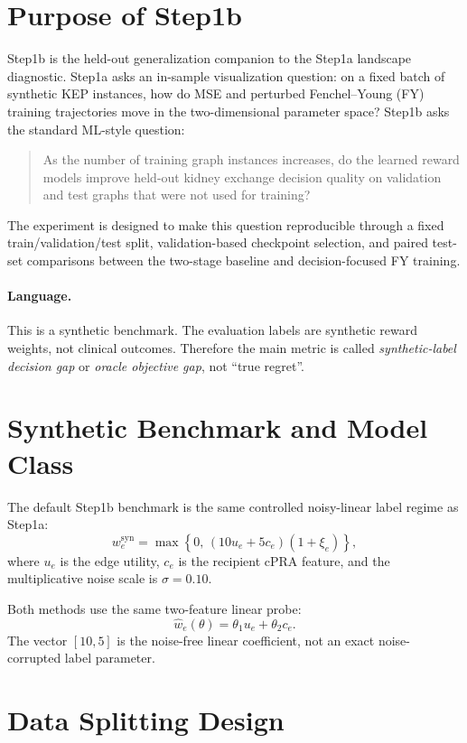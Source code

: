 \section{Purpose of Step1b}

Step1b is the held-out generalization companion to the Step1a landscape
diagnostic. Step1a asks an in-sample visualization question: on a fixed batch of
synthetic KEP instances, how do MSE and perturbed Fenchel--Young (FY) training
trajectories move in the two-dimensional parameter space? Step1b asks the
standard ML-style question:

\begin{quote}
As the number of training graph instances increases, do the learned reward
models improve held-out kidney exchange decision quality on validation and test
graphs that were not used for training?
\end{quote}

The experiment is designed to make this question reproducible through a fixed
train/validation/test split, validation-based checkpoint selection, and paired
test-set comparisons between the two-stage baseline and decision-focused FY
training.

\paragraph{Language.}
This is a synthetic benchmark. The evaluation labels are synthetic reward
weights, not clinical outcomes. Therefore the main metric is called
\emph{synthetic-label decision gap} or \emph{oracle objective gap}, not ``true
regret''.

\section{Synthetic Benchmark and Model Class}

The default Step1b benchmark is the same controlled noisy-linear label regime as
Step1a:
\[
    w^{\mathrm{syn}}_e
    =
    \max\left\{0,\,
    (10u_e + 5c_e)(1+\xi_e)
    \right\},
\]
where \(u_e\) is the edge utility, \(c_e\) is the recipient cPRA feature, and
the multiplicative noise scale is \(\sigma=0.10\).

Both methods use the same two-feature linear probe:
\[
    \hat w_e(\theta)
    =
    \theta_1 u_e + \theta_2 c_e.
\]
The vector \([10,5]\) is the noise-free linear coefficient, not an exact
noise-corrupted label parameter.

\section{Data Splitting Design}

